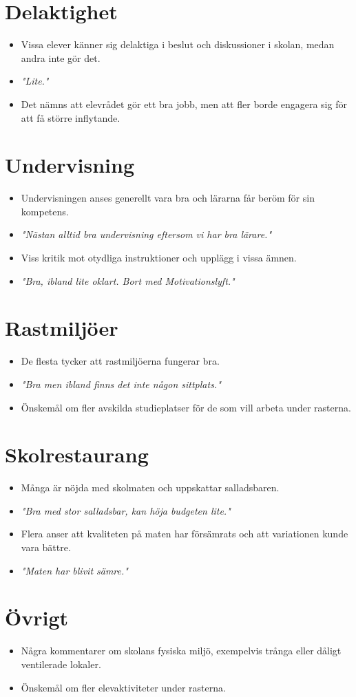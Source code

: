 \documentclass[a4paper,12pt]{article}
\begin{document}
\section*{Delaktighet}
\begin{itemize}
    \item Vissa elever känner sig delaktiga i beslut och diskussioner i skolan, medan andra inte gör det.
    \item \textit{"Lite."}
    \item Det nämns att elevrådet gör ett bra jobb, men att fler borde engagera sig för att få större inflytande.
\end{itemize}

\section*{Undervisning}
\begin{itemize}
    \item Undervisningen anses generellt vara bra och lärarna får beröm för sin kompetens.
    \item \textit{"Nästan alltid bra undervisning eftersom vi har bra lärare."}
    \item Viss kritik mot otydliga instruktioner och upplägg i vissa ämnen.
    \item \textit{"Bra, ibland lite oklart. Bort med Motivationslyft."}
\end{itemize}

\section*{Rastmiljöer}
\begin{itemize}
    \item De flesta tycker att rastmiljöerna fungerar bra.
    \item \textit{"Bra men ibland finns det inte någon sittplats."}
    \item Önskemål om fler avskilda studieplatser för de som vill arbeta under rasterna.
\end{itemize}

\section*{Skolrestaurang}
\begin{itemize}
    \item Många är nöjda med skolmaten och uppskattar salladsbaren.
    \item \textit{"Bra med stor salladsbar, kan höja budgeten lite."}
    \item Flera anser att kvaliteten på maten har försämrats och att variationen kunde vara bättre.
    \item \textit{"Maten har blivit sämre."}
\end{itemize}

\section*{Övrigt}
\begin{itemize}
    \item Några kommentarer om skolans fysiska miljö, exempelvis trånga eller dåligt ventilerade lokaler.
    \item Önskemål om fler elevaktiviteter under rasterna.
\end{itemize}
\end{document}
